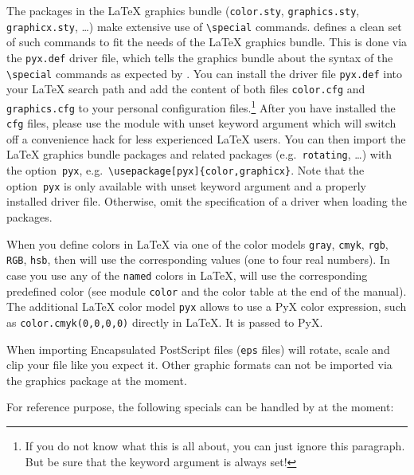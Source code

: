 The packages in the \LaTeX{} graphics bundle (\texttt{color.sty},
\texttt{graphics.sty}, \texttt{graphicx.sty}, \ldots) make extensive use of
\texttt{\textbackslash{}special} commands. \PyX{} defines a clean set of such
commands to fit the needs of the \LaTeX{} graphics bundle. This is done via the
\texttt{pyx.def} driver file, which tells the graphics bundle about the syntax
of the \texttt{\textbackslash{}special} commands as expected by \PyX{}. You can
install the driver file \texttt{pyx.def} into your \LaTeX{} search path and add
the content of both files \texttt{color.cfg} and \texttt{graphics.cfg} to your
personal configuration files.\footnote{If you do not know what this is all
about, you can just ignore this paragraph. But be sure that the
 keyword argument is always set!} After you have installed the
\texttt{cfg} files, please use the  module with unset
 keyword argument which will switch off a convenience hack
for less experienced \LaTeX{} users. You can then import the \LaTeX{} graphics
bundle packages and related packages (e.g.~\texttt{rotating}, \ldots) with the
option~\texttt{pyx},
e.g.~\texttt{\textbackslash{}usepackage[pyx]\{color,graphicx\}}. Note that the
option~\texttt{pyx} is only available with unset  keyword
argument and a properly installed driver file. Otherwise, omit the
specification of a driver when loading the packages.

When you define colors in \LaTeX{} via one of the color models \texttt{gray},
\texttt{cmyk}, \texttt{rgb}, \texttt{RGB}, \texttt{hsb}, then \PyX{} will use
the corresponding values (one to four real numbers). In case you use any of the
\texttt{named} colors in \LaTeX{}, \PyX{} will use the corresponding predefined
color (see module \texttt{color} and the color table at the end of the manual).
The additional \LaTeX{} color model \texttt{pyx} allows to use a PyX color
expression, such as \texttt{color.cmyk(0,0,0,0)} directly in LaTeX. It is
passed to PyX.

When importing Encapsulated PostScript files (\texttt{eps} files) \PyX{} will
rotate, scale and clip your file like you expect it. Other graphic formats can
not be imported via the graphics package at the moment.

For reference purpose, the following specials can be handled by \PyX{} at the
moment:

